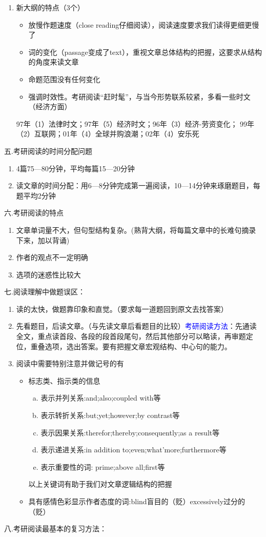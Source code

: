 \documentclass[11pt,twoside,openany,x11names,svgnames]{memoir}
\begin{document}
\begin{enumerate}
\item 新大纲的特点（3个）
\begin{itemize}
  \item 放慢作题速度（close reading仔细阅读），阅读速度要求我们读得更细更慢了
  \item 词的变化（passage变成了text），重视文章总体结构的把握，这要求从结构的角度来读文章
  \item 命题范围没有任何变化
  \item 强调时效性。考研阅读“赶时髦”，与当今形势联系较紧，多看一些时文（经济方面）
\end{itemize}
97年（1）法律时文；97年（5）经济时文；96年（3）经济-劳资变化；
99年（2）互联网；01年（4）全球并购浪潮；02年（4）安乐死
\end{enumerate}
五.考研阅读的时间分配问题
\begin{enumerate}
  \item 4篇75—80分钟，平均每篇15—20分钟
  \item 读文章的时间分配：用6—8分钟完成第一遍阅读，10—14分钟来琢磨题目，每题平均2分钟
\end{enumerate}
六.考研阅读的特点
\begin{enumerate}
  \item 文章单词量不大，但句型结构复杂。(熟背大纲，将每篇文章中的长难句摘录下来，加以背诵)
  \item 作者的观点不一定明确
  \item 选项的迷惑性比较大
\end{enumerate}
七.阅读理解中做题误区：
\begin{enumerate}
  \item 读的太快，做题靠印象和直觉。（要求每一道题回到原文去找答案）
  \item 先看题目，后读文章。（与先读文章后看题目的比较）\textcolor{blue}{考研阅读方法}：先通读全文，重点读首段、各段的段首段尾句，然后其他部分可以略读，再审题定位，重叠选项，选出答案。要有把握文章宏观结构、中心句的能力。
  \item  阅读中需要特别注意并做记号的有
  \begin{itemize}
  \item 标志类、指示类的信息
  \begin{enumerate}[(a)]
  \item 表示并列关系:and;also;coupled with等
  \item 表示转折关系:but;yet;however;by contrast等
  \item 表示因果关系:therefor;thereby;consequently;as a result等
  \item 表示递进关系:in addition to;even;what'more;furthermore等
  \item 表示重要性的词: prime;above all;first等
  \end{enumerate}
  以上关键词有助于我们对文章逻辑结构的把握
  \item 具有感情色彩显示作者态度的词:blind盲目的（贬）excessively过分的（贬）
\end{itemize}
\end{enumerate}
八.考研阅读最基本的复习方法：
\end{document}
